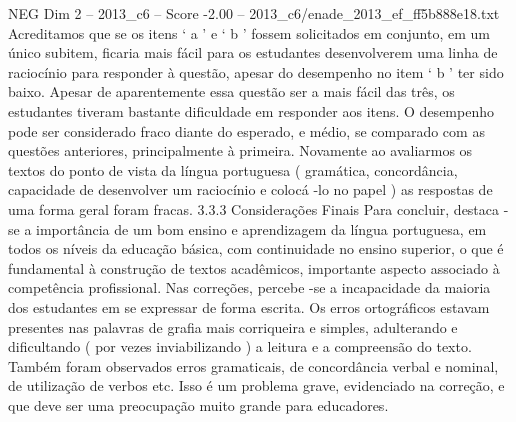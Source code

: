 \begin{textsample}{NEG Dim 2 – 2013\_c6 – Score -2.00 – 2013\_c6/enade\_2013\_ef\_ff5b888e18.txt}
Acreditamos que se os itens ‘ a ’ e ‘ b ’ fossem solicitados em conjunto, em um único subitem, ficaria mais fácil para os estudantes desenvolverem uma linha de raciocínio para responder à questão, apesar do desempenho no item ‘ b ’ ter sido baixo.
Apesar de aparentemente essa questão ser a mais fácil das três, os estudantes tiveram bastante dificuldade em responder aos itens.
O desempenho pode ser considerado fraco diante do esperado, e médio, se comparado com as questões anteriores, principalmente à primeira.
Novamente ao avaliarmos os textos do ponto de vista da língua portuguesa ( gramática, concordância, capacidade de desenvolver um raciocínio e colocá -lo no papel ) as respostas de uma forma geral foram fracas. 3.3.3 Considerações Finais Para concluir, destaca -se a importância de um bom ensino e aprendizagem da língua portuguesa, em todos os níveis da educação básica, com continuidade no ensino superior, o que é fundamental à construção de textos acadêmicos, importante aspecto associado à competência profissional.
Nas correções, percebe -se a incapacidade da maioria dos estudantes em se expressar de forma escrita.
Os erros ortográficos estavam presentes nas palavras de grafia mais corriqueira e simples, adulterando e dificultando ( por vezes inviabilizando ) a leitura e a compreensão do texto.
Também foram observados erros gramaticais, de concordância verbal e nominal, de utilização de verbos etc.
Isso é um problema grave, evidenciado na correção, e que deve ser uma preocupação muito grande para educadores.

\end{textsample}
